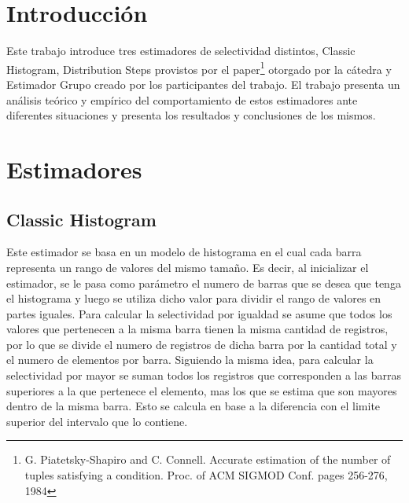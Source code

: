 \documentclass[a4paper, 10pt, twoside]{article}
\begin{document}
\newpage




\section{Introducción}

Este trabajo introduce tres estimadores de selectividad distintos, Classic Histogram, Distribution Steps provistos 
por el paper\footnote{G. Piatetsky-Shapiro and C. Connell. Accurate estimation of the number of tuples satisfying
a condition. Proc. of ACM SIGMOD Conf. pages 256-276, 1984} otorgado por la cátedra y Estimador Grupo creado por 
los participantes del trabajo. El trabajo presenta un análisis teórico y empírico del comportamiento de estos 
estimadores ante diferentes situaciones y presenta los resultados y conclusiones de los mismos.



\section{Estimadores}

\subsection{Classic Histogram}

Este estimador se basa en un modelo de histograma en el cual cada barra representa un rango
de valores del mismo tamaño.
Es decir, al inicializar el estimador, se le pasa como parámetro el numero de barras que se
desea que tenga el histograma
y luego se utiliza dicho valor para dividir el rango de valores en partes iguales.
Para calcular la selectividad por igualdad se asume que todos los valores que pertenecen a
la misma barra tienen la
 misma cantidad de registros, por lo que se divide el numero de registros de dicha barra
  por la cantidad total y el numero de elementos por barra.
Siguiendo la misma idea, para calcular la selectividad por mayor se suman todos los
registros que corresponden a las barras superiores a la que pertenece el elemento, mas los que se estima que son mayores dentro de la misma barra. Esto se calcula en base a la diferencia con el limite superior del intervalo que lo contiene.
\end{document}
